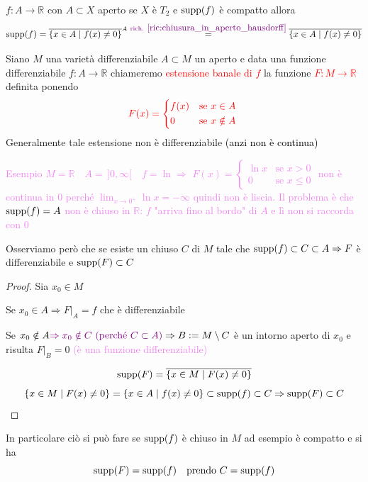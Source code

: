         \begin{osservazione}
        $f \colon A \to \mathbb{R}$ con $A \subset X$ aperto se $X$ è $T_2$ e $\operatorname{supp}(f)$ è compatto allora 
        \[ \operatorname{supp}(f) = \overline{\left\{x \in A \mid f(x) \neq 0\right\}}^A \overset{\textcolor{violet}{ \text{rich. }\ref{ric:chiusura_in_aperto_hausdorff}}}{=} \overline{\left\{x \in A \mid f(x) \neq 0\right\}} \]  
        \end{osservazione}
        \newpage
        \begin{osservazione}
        \mbox{}

        Siano $M$ una varietà differenziabile $A \subset M$ un aperto e data una funzione differenziabile
        $f \colon A \to \mathbb{R}$ chiameremo \textcolor{red}{estensione banale di $f$} la funzione \textcolor{red}{$F \colon M \to \mathbb{R}$} 
        definita ponendo
        \[ \color{red} F(x) = \begin{cases*} f(x) & se $x \in A$ \\ 0 & se $x \notin A$ \end{cases*} \]
        Generalmente tale estensione non è differenziabile \textcolor{black}{(anzi non è continua)}

        \textcolor{violet}{ Esempio $M = \mathbb{R} \quad A = \, ]0,\infty[ \quad f = \ln \Rightarrow$}
        \textcolor{violet}{ $F(x) = \begin{cases} \ln x & \text{se } x > 0 \\ 0 & \text{se } x \leq 0 \end{cases}$}
        \textcolor{violet}{non è continua in $0$ perché $\displaystyle \lim_{x \to 0^+} \ln x = -\infty$ quindi non è liscia.}
        \textcolor{violet}{Il problema è che $\operatorname{supp}(f) = A$ non è chiuso in $\mathbb{R}$: $f$ "arriva fino al bordo" di $A$ e lì non si raccorda con $0$}

        Osserviamo però che se esiste un chiuso $C$ di $M$ tale che
        $\operatorname{supp}(f) \subset C \subset A \Rightarrow F$ è differenziabile e $\operatorname{supp}(F) \subset C$
        \begin{proof}
        Sia $x_0 \in M$ 

        Se $x_0 \in A \Rightarrow F|_A =f$ che è differenziabile

        Se $x_0 \notin A \textcolor{violet}{\Rightarrow x_0 \notin C \ (\text{perché } C \subset A)}
        \Rightarrow B := M \setminus C$ è un intorno aperto di $x_0$ e risulta $F|_B=0$
        \textcolor{violet}{(è una funzione differenziabile)}

        \[ \operatorname{supp}(F) = \overline{\left\{x \in M \mid F(x) \neq 0 \right\}} \]
        \[ \left\{x \in M \mid F(x) \neq 0 \right\} = \left\{x \in A \mid f(x) \neq 0  \right\} \subset \operatorname{supp}(f) \subset C \Rightarrow \operatorname{supp}(F) \subset C  \]
        \end{proof} 
        In particolare ciò si può fare se $\operatorname{supp}(f)$ è chiuso in $M$ ad esempio è compatto e si ha 
        \[ \operatorname{supp}(F) = \operatorname{supp}(f) \quad \text{prendo } C= \operatorname{supp}(f) \]
        \end{osservazione}

